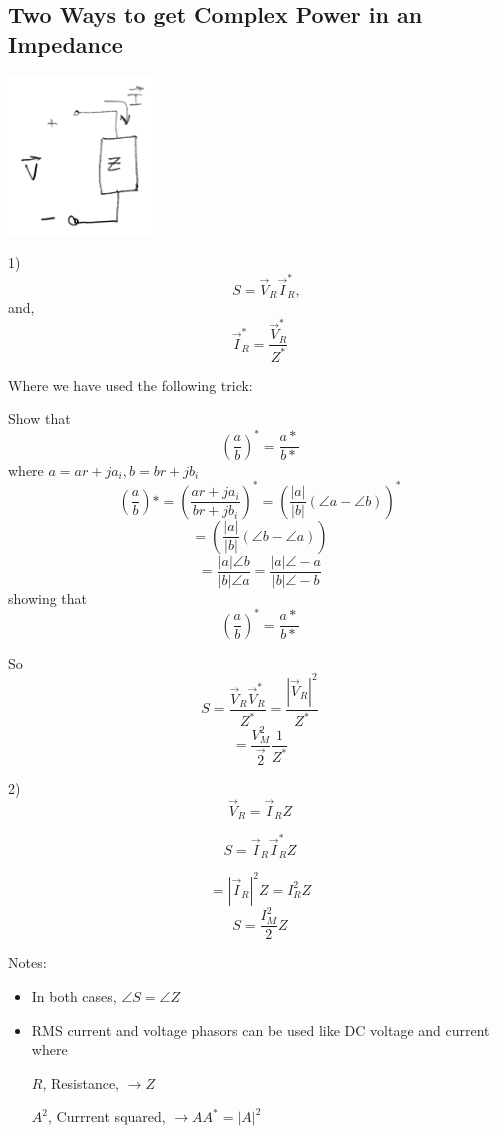 \subsection{Two Ways to get Complex Power in an Impedance}

\includegraphics[width=0.3\textwidth]{figsChapt03/MB87549.png}

1)
\[
 \quad S = \vec{V}_R \vec{I}_R^*,
\]
and,
\[
\vec{I}_R^* = \frac{\vec{V}_R^*}{Z^*}
\]

\begin{ExampleSmall}
Where we have used the following trick:

\noindent
Show that
\[
\left (\frac {a}  {b}\right )^*  =  \frac {a*}  {b*}
\]
where $a = ar+ja_i, b = br+jb_i$
\[
\left (\frac {a}  {b}\right )*  =  \left (\frac {ar+j a_i}  {br+jb_i} \right )^* =
\left (\frac {|a|}  {|b|} (\angle a - \angle b) \right )^*
\]
\[
= \left (\frac {|a|}  {|b|} (\angle b - \angle a) \right )
\]
\[
=\frac {|a|\angle b}  {|b|\angle a}
=\frac {|a|\angle -a}  {|b|\angle -b}
\]
showing that
\[
\left (\frac {a}  {b}\right )^*  =  \frac {a*}  {b*}
\]
\end{ExampleSmall}
\vspace{0.25in}

So
\[
S = \frac{\vec{V}_R \vec{V}_R^*}{Z^*} = \frac{|\vec{V}_R|^2}{Z^*}
\]
\[\boxed{
= \frac{V_M^2}{\vec{2}}\frac{1}{Z^*}
}
\]

2)
\[
\vec{V}_R = \vec{I}_R Z
\]

\[
S = \vec I_R \vec I_R^* Z
\]

\[
= |\vec{I}_R|^2 {Z} = I_R^2 {Z}
\]
\[
\boxed {
     S=  \frac{I_M^2}{2} {Z}
     }
\]

Notes:
\begin{itemize}
\item In both cases, $\angle S = \angle Z$

\item RMS current and voltage phasors can be used like DC voltage and current where

$R$, Resistance, $ \rightarrow Z$

$A^2$, Currrent squared, $ \rightarrow A A^* = |A|^2$
\end{itemize}

